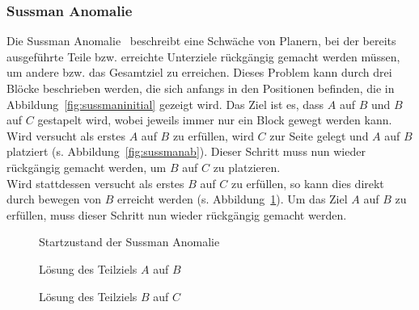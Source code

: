 \subsubsection{Sussman Anomalie}
Die Sussman Anomalie~\cite{sussman} beschreibt eine Schwäche von Planern, bei der bereits ausgeführte Teile bzw. erreichte Unterziele rückgängig gemacht werden müssen, um andere bzw. das Gesamtziel zu erreichen.
Dieses Problem kann durch drei Blöcke beschrieben werden, die sich anfangs in den Positionen befinden, die in Abbildung~\ref{fig:sussmaninitial} gezeigt wird.
Das Ziel ist es, dass $A$ auf $B$ und $B$ auf $C$ gestapelt wird, wobei jeweils immer nur ein Block gewegt werden kann.
Wird versucht als erstes $A$ auf $B$ zu erfüllen, wird $C$ zur Seite gelegt und $A$ auf $B$ platziert (s. Abbildung~\ref{fig:sussmanab}).
Dieser Schritt muss nun wieder rückgängig gemacht werden, um $B$ auf $C$ zu platzieren.\\
Wird stattdessen versucht als erstes $B$ auf $C$ zu erfüllen, so kann dies direkt durch bewegen von $B$ erreicht werden (s. Abbildung~\ref{fig:sussmanbc}).
Um das Ziel $A$ auf $B$ zu erfüllen, muss dieser Schritt nun wieder rückgängig gemacht werden.
\begin{figure}[!htb]
    \caption{Startzustand der Sussman Anomalie}\label{fig:sussmaninitial}
    \endminipage\hfill
    \caption{Lösung des Teilziels $A$ auf $B$}\label{fig:sussmanab}
    \endminipage\hfill
    \caption{Lösung des Teilziels $B$ auf $C$}\label{fig:sussmanbc}
    \endminipage
\end{figure}\\
